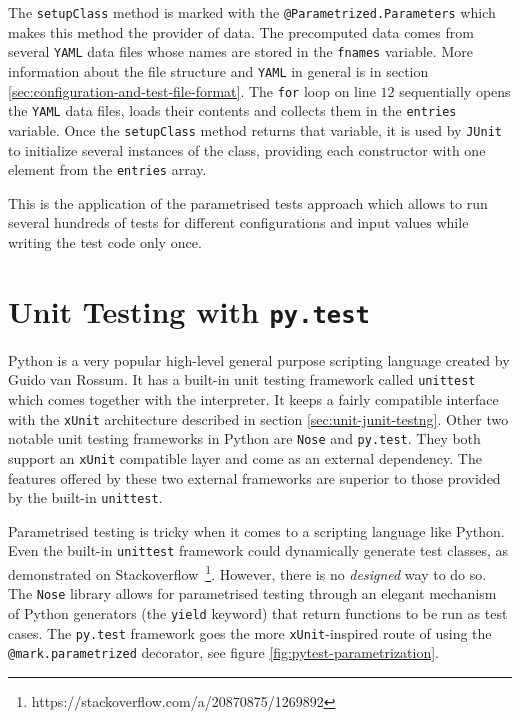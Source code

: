 The \texttt{setupClass} method is marked with the \texttt{@Parametrized.Parameters} which makes this method the provider of data. The precomputed data comes from several \texttt{YAML} data files whose names are stored in the \texttt{fnames} variable. More information about the file structure and \texttt{YAML} in general is in section \ref{sec:configuration-and-test-file-format}. The \texttt{for} loop on line \(12\) sequentially opens the \texttt{YAML} data files, loads their contents and collects them in the \texttt{entries} variable. Once the \texttt{setupClass} method returns that variable, it is used by \texttt{JUnit} to initialize several instances of the class, providing each constructor with one element from the \texttt{entries} array.

This is the application of the parametrised tests approach which allows to run several hundreds of tests for different configurations and input values while writing the test code only once.

\section{Unit Testing with \texttt{py.test}}
\label{sec:unit-pytest}

Python is a very popular high-level general purpose scripting language created by Guido van Rossum. It has a built-in unit testing framework called \texttt{unittest} which comes together with the interpreter. It keeps a fairly compatible interface with the \texttt{xUnit} architecture described in section \ref{sec:unit-junit-testng}. Other two notable unit testing frameworks in Python are \texttt{Nose} and \texttt{py.test}. They both support an \texttt{xUnit} compatible layer and come as an external dependency. The features offered by these two external frameworks are superior to those provided by the built-in \texttt{unittest}.

Parametrised testing is tricky when it comes to a scripting language like Python. Even the built-in \texttt{unittest} framework could dynamically generate test classes, as demonstrated on \mbox{Stackoverflow \footnote{https://stackoverflow.com/a/20870875/1269892}}. However, there is no \emph{designed} way to do so. The \texttt{Nose} library allows for parametrised testing through an elegant mechanism of Python generators (the \texttt{yield} keyword) that return functions to be run as test cases. The \texttt{py.test} framework goes the more \texttt{xUnit}-inspired route of using the \texttt{@mark.parametrized} decorator, see figure \ref{fig:pytest-parametrization}.

